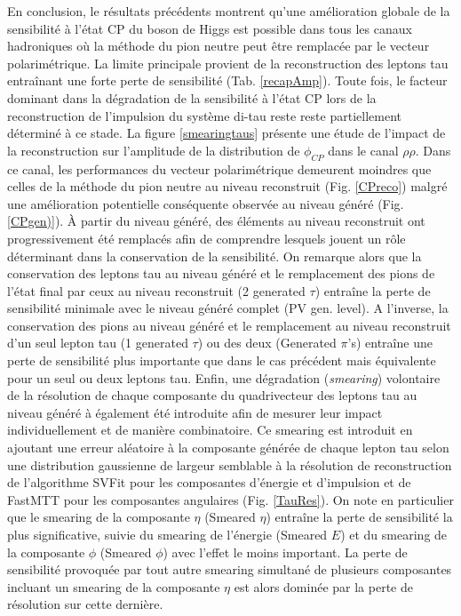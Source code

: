 En conclusion, le résultats précédents montrent qu'une amélioration globale de la sensibilité à l'état CP du boson de Higgs est possible dans tous les canaux hadroniques où la méthode du pion neutre peut être remplacée par le vecteur polarimétrique. La limite principale provient de la reconstruction des leptons tau entraînant une forte perte de sensibilité (Tab. \ref{recapAmp}). Toute fois, le facteur dominant dans la dégradation de la sensibilité à l'état CP lors de la reconstruction de l'impulsion du système di-tau reste reste partiellement déterminé à ce stade. La figure \ref{smearingtaus} présente une étude de l'impact de la reconstruction sur l'amplitude de la distribution de $\phi_{CP}$ dans le canal $\rho\rho$. Dans ce canal, les performances du vecteur polarimétrique demeurent moindres que celles de la méthode du pion neutre au niveau reconstruit (Fig. \ref{CPreco}) malgré une amélioration potentielle conséquente observée au niveau généré (Fig. \ref{CPgen)}). À partir du niveau généré, des éléments au niveau reconstruit ont progressivement été remplacés afin de comprendre lesquels jouent un rôle déterminant dans la conservation de la sensibilité. On remarque alors que la conservation des leptons tau au niveau généré et le remplacement des pions de l'état final par ceux au niveau reconstruit (2 generated $\tau$) entraîne la perte de sensibilité minimale avec le niveau généré complet (PV gen. level). A l'inverse, la conservation des pions au niveau généré et le remplacement au niveau reconstruit d'un seul lepton tau (1 generated $\tau$) ou des deux (Generated $\pi$'s) entraîne une perte de sensibilité plus importante que dans le cas précédent mais équivalente pour un seul ou deux leptons tau. Enfin, une dégradation (\textit{smearing}) volontaire de la résolution de chaque composante du quadrivecteur des leptons tau au niveau généré à également été introduite afin de mesurer leur impact individuellement et de manière combinatoire. Ce smearing est introduit en ajoutant une erreur aléatoire à la composante générée de chaque lepton tau selon une distribution gaussienne de largeur semblable à la résolution de reconstruction de l'algorithme SVFit pour les composantes d'énergie et d'impulsion et de FastMTT pour les composantes angulaires (Fig. \ref{TauRes}). On note en particulier que le smearing de la composante $\eta$ (Smeared $\eta$) entraîne la perte de sensibilité la plus significative, suivie du smearing de l'énergie (Smeared $E$) et du smearing de la composante $\phi$ (Smeared $\phi$) avec l'effet le moins important. La perte de sensibilité provoquée par tout autre smearing simultané de plusieurs composantes incluant un smearing de la composante $\eta$ est alors dominée par la perte de résolution sur cette dernière.

